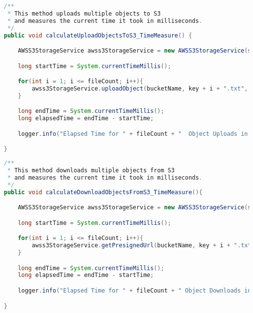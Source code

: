 \begin{lstlisting}[language=Java, caption=calculateUploadObjectsToS3\_TimeMeasure() Methode der Klasse PerformanceTest]
/**
 * This method uploads multiple objects to S3
 * and measures the current time it took in milliseconds.
 */
public void calculateUploadObjectsToS3_TimeMeasure() {

    AWSS3StorageService awss3StorageService = new AWSS3StorageService(s3Client, S3Presigner.builder().build());

    long startTime = System.currentTimeMillis();

    for(int i = 1; i <= fileCount; i++){
        awss3StorageService.uploadObject(bucketName, key + i + ".txt", filePath + key + i + ".txt", aws_encryption_key, storageClass);
    }

    long endTime = System.currentTimeMillis();
    long elapsedTime = endTime - startTime;

    logger.info("Elapsed Time for " + fileCount + "  Object Uploads in S3: " + elapsedTime +  " ms.");

}	
\end{lstlisting}

\newpage

\begin{lstlisting}[language=Java, caption=calculateDownloadObjectsFromS3\_TimeMeasure() Methode der Klasse PerformanceTest]
/**
 * This method downloads multiple objects from S3
 * and measures the current time it took in milliseconds.
 */
public void calculateDownloadObjectsFromS3_TimeMeasure(){

    AWSS3StorageService awss3StorageService = new AWSS3StorageService(s3Client, S3Presigner.builder().build());

    long startTime = System.currentTimeMillis();

    for(int i = 1; i <= fileCount; i++){
        awss3StorageService.getPresignedUrl(bucketName, key + i + ".txt", 60, aws_encryption_key);
    }

    long endTime = System.currentTimeMillis();
    long elapsedTime = endTime - startTime;

    logger.info("Elapsed Time for " + fileCount + " Object Downloads in S3: " + elapsedTime +  " ms.");

}
\end{lstlisting}



